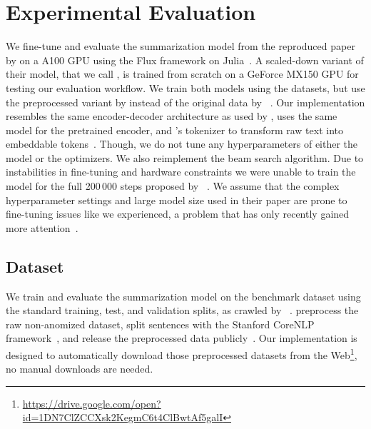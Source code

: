 \section{Experimental Evaluation} %

We fine-tune and evaluate the \BertSumAbs summarization model from the reproduced paper by \citeauthor{LiuL2019} on a A100 GPU using the Flux framework on Julia~\cite{InnesSFGRJKPS2018,BezansonEKS2017,LiuL2019}.
A scaled-down variant of their \TransformerAbs model, that we call \TransformerAbsTiny, is trained from scratch on a GeForce MX150 GPU for testing our evaluation workflow.
We train both models using the \CnnDailyMail datasets, but use the preprocessed variant by \citeauthor{LiuL2019} instead of the original data by \citeauthor{HermannKGEKSB2015}~\cite{LiuL2019,HermannKGEKSB2015}.
Our implementation resembles the same encoder-decoder architecture as used by \citeauthor{LiuL2019}, uses the same \BertBase model for the pretrained encoder, and \Bert's \WordPiece tokenizer to transform raw text into embeddable tokens~\cite{LiuL2019,DevlinCLT2019}.
Though, we do not tune any hyperparameters of either the model or the optimizers.
We also reimplement the beam search algorithm.
Due to instabilities in fine-tuning and hardware constraints we were unable to train the model for the full 200\,000 steps proposed by \citeauthor{LiuL2019}~\cite{LiuL2019}.
We assume that the complex hyperparameter settings and large model size used in their paper are prone to fine-tuning issues like we experienced, a problem that has only recently gained more attention~\cite{DodgeISFHS2020,ZhangWKWA2020,AghajanyanSGGZG2020}.

\subsection{Dataset}

We train and evaluate the summarization model on the \CnnDailyMail benchmark dataset using the standard training, test, and validation splits, as crawled by \citeauthor{NallapatiZSGX2016}~\cite{HermannKGEKSB2015,NallapatiZSGX2016}.
\citeauthor{LiuL2019} preprocess the raw non-anomized \CnnDailyMail dataset, split sentences with the Stanford CoreNLP framework~\cite{ManningSBFBM2014}, and release the preprocessed data publicly~\cite{LiuL2019}.
Our implementation is designed to automatically download those preprocessed \CnnDailyMail datasets from the Web\footnote{\url{https://drive.google.com/open?id=1DN7ClZCCXsk2KegmC6t4ClBwtAf5galI}}, no manual downloads are needed.

